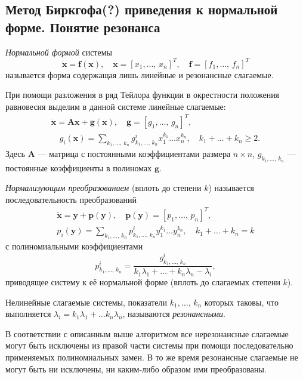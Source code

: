 \documentclass[a4paper]{article}
\begin{document}
\subsection{Метод Биркгофа(?) приведения к нормальной форме. Понятие резонанса}
\begin{dfn}
	\emph{Нормальной формой} системы
	\[
		\dot{\mathbf{x}}=\mathbf{f}(\mathbf{x}),\quad
		\mathbf{x}=[x_1,\ldots,\,x_n]^T, \quad 
		\mathbf{f}=[f_1,\ldots,\,f_n]^T
	\]
	называется форма содержащая лишь линейные и резонансные слагаемые.
\end{dfn}
При помощи разложения в ряд Тейлора функции    в окрестности
положения равновесия выделим в данной системе линейные слагаемые:
\begin{gather*}
	\dot{\mathbf{x}}= \mathbf{Ax}+\boldsymbol{g}(\mathbf{x}),\quad
	\boldsymbol{g}=[g_1,\ldots,\,g_n]^T,\\ \quad g_i(\mathbf{x})=
	\sum_{k_1,\ldots,\,k_n}^{} g_{k_1,\ldots,\,k_n}^i x_1^{k_1}\ldots
	x_n ^{k_n},\quad k_1+\ldots+k_n \ge 2
.\end{gather*}
Здесь $\mathbf{A}$ --- матрица с постоянными коэффициентами размера $n \times n$,
$g_{k_1,\ldots,\,k_n}$ --- постоянные коэффициенты в полиномах $\boldsymbol{g}$.
\begin{dfn}
	\emph{Нормализующим преобразованием} (вплоть до степени $k$) 
	называется последовательность преобразований
	\begin{gather*}
		\tilde{\mathbf{x}}=\mathbf{y}+ \mathbf{p}(\mathbf{y}),\quad
		\mathbf{p}(\mathbf{y})=[p_1,\ldots,\,p_n]^T,\\
		p_i(\mathbf{y})= \sum_{k_1,\ldots,\,k_n}^{} p^i_{k_1,\ldots,\,k_n}
		y_1^{k_1}\ldots y_n^{k_n},\quad k_1+\ldots+k_n=k
	\end{gather*}
	с полиномиальными коэффициентами
	\[
	p_{k_1,\ldots,\,k_n}^i=\frac{g_{k_1,\ldots,\,k_n}^i}{k_1 \lambda_1+
	\ldots+k_n \lambda_n-\lambda_i}
	,\] 
	приводящее систему к её нормальной форме (вплоть до слагаемых степени
	$k$).
\end{dfn}
\begin{dfn}
	Нелинейные слагаемые системы, показатели $k_1,\ldots,\,k_n$ которых
	таковы, что выполняется $\lambda_i=k_1 \lambda_1+\ldots k_n \lambda_n$,
	называются \emph{резонансными}.
\end{dfn}
В соответствии с описанным выше алгоритмом все нерезонансные слагаемые могут
быть исключены из правой части системы при помощи последовательно применяемых
полиномиальных замен. В то же время резонансные слагаемые не могут быть ни
исключены, ни каким-либо образом ими преобразованы.
\end{document}
